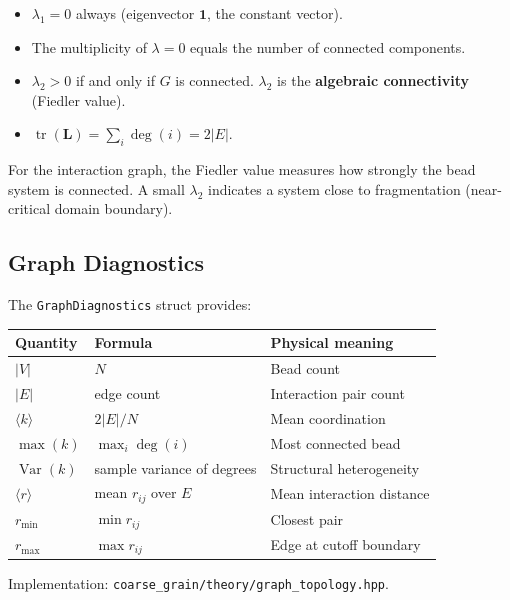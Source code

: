 \documentclass[11pt, a4paper, oneside]{article}
\newcommand{\file}[1]{\texttt{#1}}
\newcommand{\type}[1]{\texttt{#1}}
\DeclareMathOperator{\tr}{tr}
\DeclareMathOperator{\Var}{Var}
\begin{document}
\begin{itemize}
\item $\lambda_1 = 0$ always (eigenvector $\mathbf{1}$, the constant vector).
\item The multiplicity of $\lambda = 0$ equals the number of connected
      components.
\item $\lambda_2 > 0$ if and only if $G$ is connected.
      $\lambda_2$ is the \textbf{algebraic connectivity} (Fiedler value).
\item $\tr(\mathbf{L}) = \sum_i \deg(i) = 2|E|$.
\end{itemize}

For the interaction graph, the Fiedler value measures how strongly the
bead system is connected.  A small $\lambda_2$ indicates a system close
to fragmentation (near-critical domain boundary).

\subsection{Graph Diagnostics}

The \type{GraphDiagnostics} struct provides:

\begin{center}
\small
\begin{tabular}{lll}
\toprule
\textbf{Quantity} & \textbf{Formula} & \textbf{Physical meaning} \\
\midrule
$|V|$           & $N$                        & Bead count \\
$|E|$           & edge count                 & Interaction pair count \\
$\langle k\rangle$ & $2|E|/N$                & Mean coordination \\
$\max(k)$       & $\max_i \deg(i)$           & Most connected bead \\
$\Var(k)$       & sample variance of degrees & Structural heterogeneity \\
$\langle r\rangle$ & mean $r_{ij}$ over $E$  & Mean interaction distance \\
$r_{\min}$      & $\min r_{ij}$              & Closest pair \\
$r_{\max}$      & $\max r_{ij}$              & Edge at cutoff boundary \\
\bottomrule
\end{tabular}
\end{center}

Implementation: \file{coarse\_grain/theory/graph\_topology.hpp}.
\end{document}
